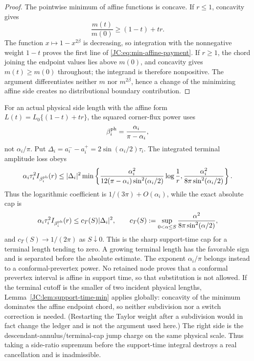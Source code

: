 \begin{proof}
The pointwise minimum of affine functions is concave.  If $r\le1$,
concavity gives
\[
 \frac{m(t)}{m(0)}\ge(1-t)+tr.
\]
The function $x\mapsto1-x^{2\beta}$ is decreasing, so integration with
the nonnegative weight $1-t$ proves the first line of
\eqref{JC:eq:min-affine-payment}.  If $r\ge1$, the chord joining the endpoint
values lies above $m(0)$, and concavity gives $m(t)\ge m(0)$ throughout;
the integrand is therefore nonpositive.  The argument differentiates
neither $m$ nor $m^{2\beta}$, hence a change of the minimizing affine side
creates no distributional boundary contribution.
\end{proof}

\begin{remark}
For an actual physical side length with the affine form
$L(t)=L_0\{(1-t)+tr\}$, the squared corner-flux power uses
\begin{equation}\label{JC:eq:physical-corner-exponent}
 \beta_i^{\rm ph}=\frac{\alpha_i}{\pi-\alpha_i},
\end{equation}
not $\alpha_i/\pi$.  Put
$\Delta_i=a_i^--a_i^+=2\sin(\alpha_i/2)\tau_i$.  The integrated terminal
amplitude loss obeys
\begin{equation}\label{JC:eq:terminal-log-payment}
 \alpha_i\tau_i^2 I_{\beta_i^{\rm ph}}(r)
 \le |\Delta_i|^2\min\left\{
 \frac{\alpha_i^2}{12(\pi-\alpha_i)\sin^2(\alpha_i/2)}
       \log\frac1r,
 \frac{\alpha_i^2}{8\pi\sin^2(\alpha_i/2)}\right\}.
\end{equation}
Thus the logarithmic coefficient is $1/(3\pi)+O(\alpha_i)$, while the
exact absolute cap is
\begin{equation}\label{JC:eq:terminal-absolute-payment}
 \alpha_i\tau_i^2 I_{\beta_i^{\rm ph}}(r)
 \le c_T(S)|\Delta_i|^2,
 \qquad
 c_T(S):=\sup_{0<\alpha\le S}
 \frac{\alpha^2}{8\pi\sin^2(\alpha/2)},
\end{equation}
and $c_T(S)\to1/(2\pi)$ as $S\downarrow0$.  This is the sharp
support-time cap for a terminal length tending to zero.  A growing
terminal length has the favorable sign and is separated before the
absolute estimate.
The exponent $\alpha_i/\pi$ belongs instead to a conformal-prevertex
power.  No retained node proves that a conformal prevertex interval is
affine in support time, so that substitution is not allowed.  If the
terminal cutoff is the smaller of two incident physical lengths,
Lemma~\ref{JC:lem:support-time-min} applies globally: concavity of the
minimum dominates the affine endpoint chord, so neither subdivision nor a
switch correction is needed.  (Restarting the Taylor weight after a
subdivision would in fact change the ledger and is not the argument used
here.)
The right side is the descendant-annulus/terminal-cap jump charge on the
same physical scale.  Thus taking a side-ratio supremum before the
support-time integral destroys a real cancellation and is inadmissible.
\end{remark}

